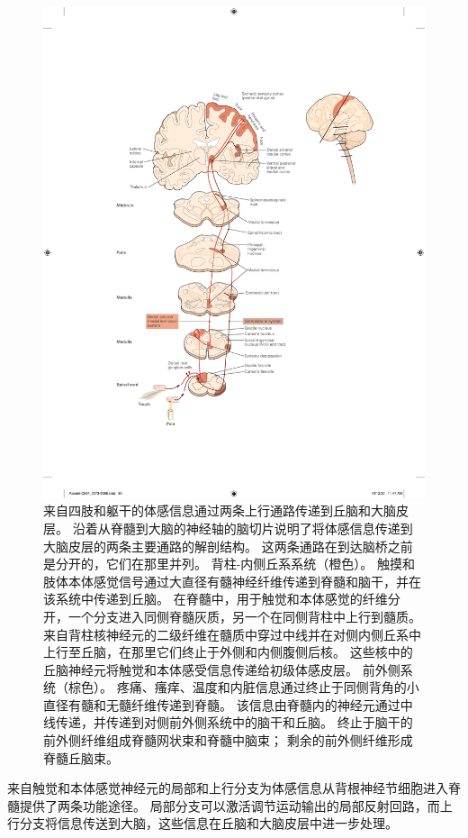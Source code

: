 \begin{figure}[htbp]
	\centering
	\includegraphics[width=0.95\linewidth]{chap04/fig_4_6}
	\caption{来自四肢和躯干的体感信息通过两条上行通路传递到丘脑和大脑皮层。
		沿着从脊髓到大脑的神经轴的脑切片说明了将体感信息传递到大脑皮层的两条主要通路的解剖结构。
		这两条通路在到达脑桥之前是分开的，它们在那里并列。 背柱-内侧丘系系统（橙色）。
		触摸和肢体本体感觉信号通过大直径有髓神经纤维传递到脊髓和脑干，并在该系统中传递到丘脑。
		在脊髓中，用于触觉和本体感觉的纤维分开，一个分支进入同侧脊髓灰质，另一个在同侧背柱中上行到髓质。 
		来自背柱核神经元的二级纤维在髓质中穿过中线并在对侧内侧丘系中上行至丘脑，在那里它们终止于外侧和内侧腹侧后核。
		这些核中的丘脑神经元将触觉和本体感受信息传递给初级体感皮层。
		前外侧系统（棕色）。
		疼痛、瘙痒、温度和内脏信息通过终止于同侧背角的小直径有髓和无髓纤维传递到脊髓。
		该信息由脊髓内的神经元通过中线传递，并传递到对侧前外侧系统中的脑干和丘脑。
		终止于脑干的前外侧纤维组成脊髓网状束和脊髓中脑束； 剩余的前外侧纤维形成脊髓丘脑束。}
	\label{fig:4_6}
\end{figure}


来自触觉和本体感觉神经元的局部和上行分支为体感信息从背根神经节细胞进入脊髓提供了两条功能途径。 
局部分支可以激活调节运动输出的局部反射回路，而上行分支将信息传送到大脑，这些信息在丘脑和大脑皮层中进一步处理。



